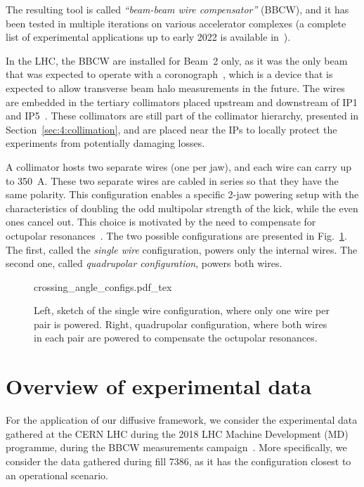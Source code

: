 The resulting tool is called \textit{``beam-beam wire compensator''} (BBCW), and it has been tested in multiple iterations on various accelerator complexes (a complete list of experimental applications up to early 2022 is available in~\cite{axel.wires}).

In the LHC, the BBCW are installed for Beam~2 only, as it was the only beam that was expected to operate with a coronograph~\cite{Goldblatt:2313940}, which is a device that is expected to allow transverse beam halo measurements in the future. The wires are embedded in the tertiary collimators placed upstream and downstream of IP1 and IP5~\cite{Rossi:2696270}. These collimators are still part of the collimator hierarchy, presented in Section~\ref{sec:4:collimation}, and are placed near the IPs to locally protect the experiments from potentially damaging losses.

A collimator hosts two separate wires (one per jaw), and each wire can carry up to \SI{350}{\ampere}. These two separate wires are cabled in series so that they have the same polarity. This configuration enables a specific 2-jaw powering setup with the characteristics of doubling the odd multipolar strength of the kick, while the even ones cancel out. This choice is motivated by the need to compensate for octupolar resonances~\cite{Poyet:2703503}. The two possible configurations are presented in Fig.~\ref{fig:wire-configs}. The first, called the \textit{single wire} configuration, powers only the internal wires. The second one, called \textit{quadrupolar configuration}, powers both wires.

\begin{figure}[hpt]
    \centering
    \def\svgwidth{1.0\textwidth}
    {crossing_angle_configs.pdf_tex}
    \caption{Left, sketch of the single wire configuration, where only one wire per pair is powered. Right, quadrupolar configuration, where both wires in each pair are powered to compensate the octupolar resonances.}
    \label{fig:wire-configs}
\end{figure}

\section{Overview of experimental data}\label{sec:5:wire-data}

For the application of our diffusive framework, we consider the experimental data gathered at the CERN LHC during the 2018 LHC Machine Development (MD) programme, during the BBCW measurements campaign~\cite{Poyet:2703503}. More specifically, we consider the data gathered during fill 7386, as it has the configuration closest to an operational scenario.

